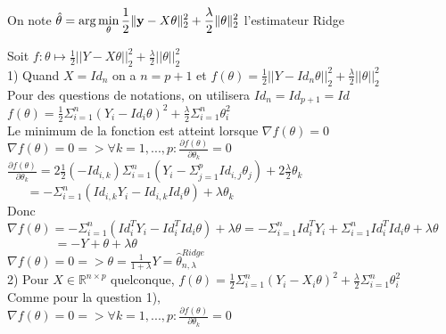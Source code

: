 \documentclass[11pt,a4paper,fleqn]{article}
\begin{document}
On note $\hat \theta = {\rm arg} \displaystyle\min_{\theta} \frac{1}{2}\| \mathbf{y} -X \theta \|_2^2+ \frac{\lambda}{2}\|\theta\|_2^2$ l’estimateur Ridge

Soit $f: \theta \mapsto \frac{1}{2}||Y-X\theta||_2^2+\frac{\lambda}{2}||\theta||_2^2$ \\

1) Quand $X=Id_n$ on a $n=p+1$ et $f(\theta)=\frac{1}{2}||Y-Id_n\theta||_2^2+\frac{\lambda}{2}||\theta||_2^2$ \\

Pour des questions de notations, on utilisera $Id_n=Id_{p+1}=Id$ \\

$f(\theta)=\frac{1}{2}\Sigma_{i=1}^n(Y_i-Id_i\theta)^2+\frac{\lambda}{2} \Sigma_{i=1}^n \theta_i^2$ \\

Le minimum de la fonction est atteint lorsque $\nabla f(\theta) = 0$ \\

$\nabla f(\theta) = 0 => \forall k=1,...,p: \frac{\partial f(\theta)}{\partial \theta_k}=0$ \\

$\frac{\partial f(\theta)}{\partial \theta_k}=2\frac{1}{2} (-Id_{i,k}) \Sigma_{i=1}^n (Y_i-\Sigma_{j=1}^pId_{i,j}\theta_j)+2\frac{\lambda}{2} \theta_k$ \\

$~~~~~~~=-\Sigma_{i=1}^n(Id_{i,k}Y_i-Id_{i,k}Id_i\theta)+\lambda \theta_k$ \\

Donc $\nabla f(\theta)=-\Sigma_{i=1}^n(Id_i^TY_i-Id_i^TId_i\theta)+\lambda \theta=-\Sigma_{i=1}^nId_i^TY_i+\Sigma_{i=1}^nId_i^TId_i \theta +\lambda \theta$ \\

$~~~~~~~~~~~~~~~~~=-Y+\theta+\lambda \theta$ \\

$\nabla f(\theta) = 0 => \theta = \frac{1}{1+\lambda}Y= \hat{\theta}_{n,\lambda}^{Ridge} $\\


2) Pour $X \in \mathbb{R}^{n \times p}$ quelconque, $f(\theta)=\frac{1}{2}\Sigma_{i=1}^n(Y_i-X_i\theta)^2+\frac{\lambda}{2} \Sigma_{i=1}^n \theta_i^2$ \\

Comme pour la question 1), \\
$\nabla f(\theta) = 0 => \forall k=1,...,p: \frac{\partial f(\theta)}{\partial \theta_k}=0$ \\
\end{document}
